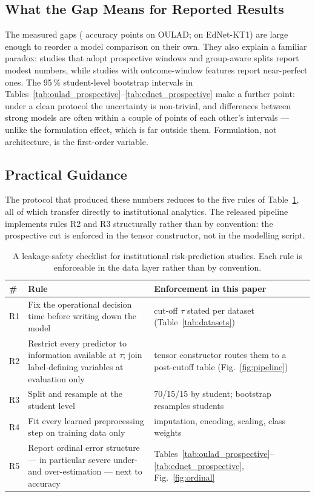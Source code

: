 \documentclass[sn-mathphys,Numbered]{sn-jnl}
\begin{document}
\subsection{What the Gap Means for Reported Results}\label{sec:disc_gap}

The measured gaps (\gapOULADaccRange{} accuracy points on OULAD; \gapEdNetaccRange{} on EdNet-KT1) are large enough to reorder a model comparison on their own. They also explain a familiar paradox: studies that adopt prospective windows and group-aware splits report modest numbers, while studies with outcome-window features report near-perfect ones. The 95\,\% student-level bootstrap intervals in Tables~\ref{tab:oulad_prospective}--\ref{tab:ednet_prospective} make a further point: under a clean protocol the uncertainty is non-trivial, and differences between strong models are often within a couple of points of each other's intervals --- unlike the formulation effect, which is far outside them. Formulation, not architecture, is the first-order variable.

\subsection{Practical Guidance}\label{sec:disc_guidance}

The protocol that produced these numbers reduces to the five rules of Table~\ref{tab:checklist}, all of which transfer directly to institutional analytics. The released pipeline implements rules R2 and R3 structurally rather than by convention: the prospective cut is enforced in the tensor constructor, not in the modelling script.

\begin{table}[ht]
\caption{A leakage-safety checklist for institutional risk-prediction studies. Each rule is enforceable in the data layer rather than by convention.\label{tab:checklist}}
\centering\footnotesize
\begin{tabular*}{\textwidth}{@{\extracolsep\fill}p{0.9cm}p{6.3cm}p{5.6cm}}
\toprule
\textbf{\#} & \textbf{Rule} & \textbf{Enforcement in this paper} \\
\midrule
R1 & Fix the operational decision time before writing down the model & cut-off $\tau$ stated per dataset (Table~\ref{tab:datasets}) \\
R2 & Restrict every predictor to information available at $\tau$; join label-defining variables at evaluation only & tensor constructor routes them to a post-cutoff table (Fig.~\ref{fig:pipeline}) \\
R3 & Split and resample at the student level & 70/15/15 by student; bootstrap resamples students \\
R4 & Fit every learned preprocessing step on training data only & imputation, encoding, scaling, class weights \\
R5 & Report ordinal error structure --- in particular severe under- and over-estimation --- next to accuracy & Tables~\ref{tab:oulad_prospective}--\ref{tab:ednet_prospective}, Fig.~\ref{fig:ordinal} \\
\bottomrule
\end{tabular*}
\end{table}
\end{document}

